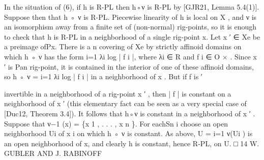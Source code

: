 \documentclass[
  10pt,
]{article}
\newenvironment{Shaded}{}{}
\newcommand{\NormalTok}[1]{#1}
\begin{document}
\begin{Shaded}
\begin{Highlighting}[]
\NormalTok{    In the situation of (6), if h is R{-}PL then h◦ν is R{-}PL by [GJR21, Lemma 5.4(1)]. Suppose}
\NormalTok{then that h ◦ ν is R{-}PL. Piecewise linearity of h is local on X , and ν is an isomorphism}
\NormalTok{away from a finite set of (non{-}normal) rig{-}points, so it is enough to check that h is R{-}PL}
\NormalTok{in a neighborhood of a single rig{-}point x. Let x ′ ∈ Xe be a preimage ofPx. There is a}
\NormalTok{                                                                                          n}
\NormalTok{covering of Xe by strictly affinoid domains on which h ◦ ν has the form i=1 λi log | f i |,}
\NormalTok{where λi ∈ R and f i ∈ O × . Since x ′ is      Pan rig{-}point, it is contained in the interior   of one}
\NormalTok{of these affinoid domains, so h ◦ ν = i=1 λi log | f i | in a neighborhood of x . But if f is}
\NormalTok{                                                                                          ′}

\NormalTok{invertible in a neighborhood of a rig{-}point x ′ , then | f | is constant on a neighborhood of}
\NormalTok{x ′ (this elementary fact can be seen as a very special case of [Duc12, Theorem 3.4]). It}
\NormalTok{follows that h◦ν is constant in a neighborhood of x ′ . Suppose that ν−1 (x) = \{x 1 , . . . , x n \}.}
\NormalTok{For eachSn i choose an open neighborhood Ui of x i on which h ◦ ν is constant. As above,}
\NormalTok{U = i=1 ν(Ui ) is an open neighborhood of x, and clearly h is constant, hence R{-}PL,}
\NormalTok{on U.                                                                                                 □}
\NormalTok{14                                  W. GUBLER AND J. RABINOFF}


\end{Highlighting}
\end{Shaded}
\end{document}
